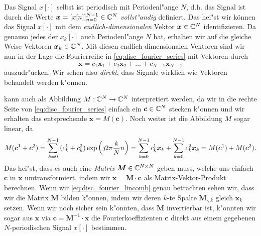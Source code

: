 Das Signal $x[\cdot]$ selbst ist periodisch mit Periodenl"ange $N$, d.h. das Signal ist durch die Werte $\bm x = [x[n]]_{n=0}^{N-1} \in \mathbb{C}^N$ \emph{vollst"andig} definiert. Das hei"st wir k\"onnen das Signal $x[\cdot]$ mit dem \emph{endlich-dimensionalen} Vektor $\bm x \in \mathbb{C}^N$ identifizieren.
Da genauso jedes der $x_k[\cdot]$ auch Periodenl"ange $N$ hat, erhalten wir auf die gleiche Weise Vektoren $\bm x_k \in \mathbb{C}^N$.
Mit diesen endlich-dimensionalen Vektoren sind wir nun in der Lage die Fourierreihe in \eqref{eq:disc_fourier_series} mit  Vektoren durch
%
\begin{equation}\label{eq:disc_fourier_lincomb}
    \bm x = c_1 \bm x_1 + c_2 \bm x_2 + \ldots + c_{N-1} \bm x_{N-1}
\end{equation}
%
auszudr"ucken.
Wir sehen also \emph{direkt}, dass Signale wirklich wie Vektoren behandelt werden k"onnen.

 kann auch als Abbildung $M : \mathbb{C}^N \rightarrow \mathbb{C}^N$ interpretiert werden, da wir in die rechte Seite von \eqref{eq:disc_fourier_series} einfach ein $\bm c \in \mathbb{C}^N$ stecken k"onnen und wir erhalten das entsprechende $\bm x = M(\bm c)$.
Noch weiter ist die Abbildung $M$ sogar linear, da 
\[
    M(\bm c^1 + \bm c^2)
        =  {\sum\limits_{k = 0}^{N-1}{
            (c^1_k + c^2_k) \exp\left(
                \jmath 2 \pi \frac{k}{N} n
            \right) 
        }}
        =  {\sum\limits_{k = 0}^{N-1}{
            c^1_k \bm x_k
        }}
        + {\sum\limits_{k = 0}^{N-1}{
            c^2_k \bm x_k 
        }}
        = M(\bm c^1) + M(\bm c^2).
\]
Das hei"st, dass es auch eine \emph{Matrix} $\bm M \in \mathbb{C}^{N \times N}$ geben muss, welche uns einfach $\bm c$ in $\bm x$ umtransformiert, indem wir $\bm x = \bm M \cdot \bm c$ als Matrix-Vektor-Produkt berechnen.
Wenn wir \eqref{eq:disc_fourier_lincomb} genau betrachten sehen wir, dass wir die Matrix $\bm M$ bilden k"onnen, indem wir deren $k$-te Spalte $\bm M_{\cdot, k}$ gleich $\bm x_k$ setzen.
Wenn wir noch sicher sein k"onnten, dass $\bm M$ invertierbar ist, k"onnten wir sogar aus $\bm x$ via $\bm c = \bm M^{-1} \cdot \bm x$ die Fourierkoeffizienten $\bm c$ direkt aus einem gegebenen $N$-periodischen Signal $x[\cdot]$ bestimmen.
%
%
